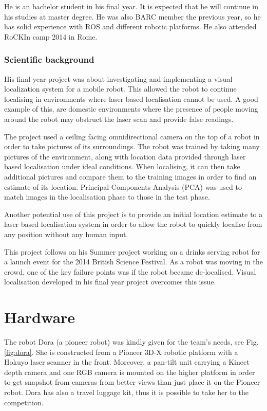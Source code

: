 \documentclass[conference]{IEEEtran}
\begin{document}
He is an bachelor student in his final year. It is expected that he will continue in his studies at master degree. He was also BARC member the previous year, so he has solid experience with ROS and different robotic platforms. He also attended RoCKIn camp 2014 in Rome.

\subsubsection*{Scientific background}
 
His final year project was about investigating and implementing a visual localization system for a mobile robot. This allowed the robot to continue localising in environments where laser based localisation cannot be used. A good example of this, are domestic environments where the presence of people moving around the robot may obstruct the laser scan and provide false readings.
 
The project used a ceiling facing omnidirectional camera on the top of a robot in order to take pictures of its surroundings.
The robot was trained by taking many pictures of the environment, along with location data provided through laser based localisation under ideal conditions. When localising, it can then take additional pictures and compare them to the training images in order to find an estimate of its location. Principal Components Analysis (PCA) was used to match images in the localisation phase to those in the test phase. 

Another potential use of this project is to provide an initial location estimate to a laser based localisation system in order to allow the robot to quickly localise from any position without any human input.

This project follows on his Summer project working on a drinks serving robot for a launch event for the 2014 British Science Festival. As a robot was moving in the crowd, one of the key failure points was if the robot became de-localised. Visual localisation developed in his final year project overcomes this issue.

\section{\label{sec:hardware}Hardware}
The robot Dora (a pioneer robot) was kindly given for the team's needs, see Fig.\ref{fig:dora}. She is constructed from a Pioneer 3D-X robotic platform with a Hokuyo laser scanner in the front. Moreover, a pan-tilt unit carrying a Kinect depth camera and one RGB camera
is mounted on the higher platform in order to get snapshot from cameras from better views than just place it on the Pioneer robot. Dora has also a travel luggage kit, thus it is possible to take her to the competition.
\end{document}
